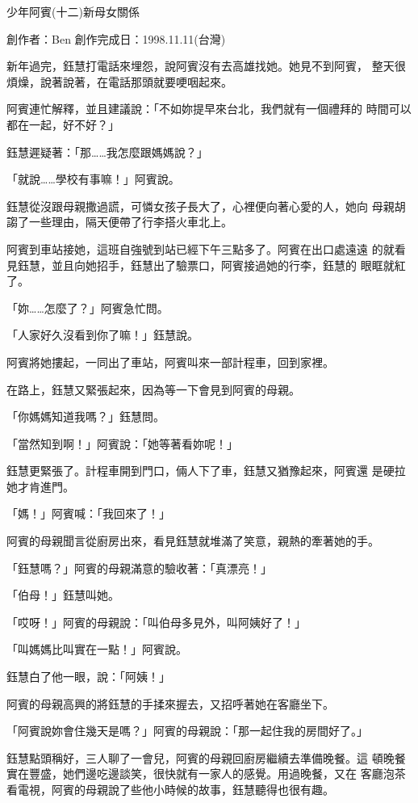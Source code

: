 



少年阿賓(十二)新母女關係

創作者：Ben
創作完成日：1998.11.11(台灣)


新年過完，鈺慧打電話來埋怨，說阿賓沒有去高雄找她。她見不到阿賓，
整天很煩燥，說著說著，在電話那頭就要哽咽起來。

阿賓連忙解釋，並且建議說：「不如妳提早來台北，我們就有一個禮拜的
時間可以都在一起，好不好？」

鈺慧遲疑著：「那……我怎麼跟媽媽說？」

「就說……學校有事嘛！」阿賓說。

鈺慧從沒跟母親撒過謊，可憐女孩子長大了，心裡便向著心愛的人，她向
母親胡謅了一些理由，隔天便帶了行李搭火車北上。

阿賓到車站接她，這班自強號到站已經下午三點多了。阿賓在出口處遠遠
的就看見鈺慧，並且向她招手，鈺慧出了驗票口，阿賓接過她的行李，鈺慧的
眼眶就紅了。

「妳……怎麼了？」阿賓急忙問。

「人家好久沒看到你了嘛！」鈺慧說。

阿賓將她摟起，一同出了車站，阿賓叫來一部計程車，回到家裡。

在路上，鈺慧又緊張起來，因為等一下會見到阿賓的母親。

「你媽媽知道我嗎？」鈺慧問。

「當然知到啊！」阿賓說：「她等著看妳呢！」

鈺慧更緊張了。計程車開到門口，倆人下了車，鈺慧又猶豫起來，阿賓還
是硬拉她才肯進門。

「媽！」阿賓喊：「我回來了！」

阿賓的母親聞言從廚房出來，看見鈺慧就堆滿了笑意，親熱的牽著她的手。

「鈺慧嗎？」阿賓的母親滿意的驗收著：「真漂亮！」

「伯母！」鈺慧叫她。

「哎呀！」阿賓的母親說：「叫伯母多見外，叫阿姨好了！」

「叫媽媽比叫實在一點！」阿賓說。

鈺慧白了他一眼，說：「阿姨！」

阿賓的母親高興的將鈺慧的手揉來握去，又招呼著她在客廳坐下。

「阿賓說妳會住幾天是嗎？」阿賓的母親說：「那一起住我的房間好了。」

鈺慧點頭稱好，三人聊了一會兒，阿賓的母親回廚房繼續去準備晚餐。這
頓晚餐實在豐盛，她們邊吃邊談笑，很快就有一家人的感覺。用過晚餐，又在
客廳泡茶看電視，阿賓的母親說了些他小時候的故事，鈺慧聽得也很有趣。

